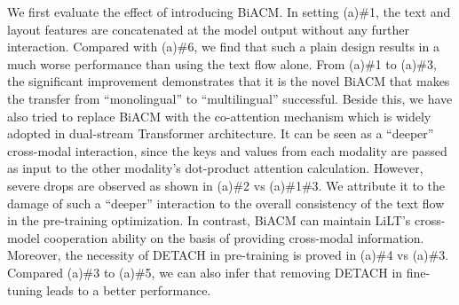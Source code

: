 \documentclass[11pt]{article}
\begin{document}
We first evaluate the effect of introducing BiACM. In setting (a)\#1, the text and layout features are concatenated at the model output without any further interaction.
Compared with (a)\#6, we find that such a plain design results in a much worse performance than using the text flow alone. 
From  (a)\#1 to  (a)\#3, the significant improvement demonstrates that 
it is the novel BiACM that makes the transfer from ``monolingual” to ``multilingual” successful. Beside this, we have also tried to replace BiACM with the co-attention mechanism \cite{lu2019vilbert} which is widely adopted in  dual-stream Transformer architecture. It can be seen as a  ``deeper” cross-modal interaction, since  the keys and values from each modality are passed as input to the other modality’s dot-product attention calculation. However, severe drops are observed as shown in (a)\#2 vs (a)\#1\#3. We attribute it to  the damage of such a ``deeper”  interaction to the overall consistency of the text flow in the pre-training optimization. In contrast, BiACM can maintain LiLT's cross-model cooperation ability on the basis of providing cross-modal information.
Moreover, the necessity of DETACH in pre-training is  proved  in (a)\#4 vs (a)\#3.
Compared (a)\#3 to (a)\#5, we can also infer that removing DETACH in fine-tuning leads to a better performance.


\begin{table}[!]
\centering
{}
\caption{Comparison on the semantic entity recognition (SER)  task of CORD \cite{park2019cord} dataset. \cite{garncarek2020lambert};\cite{2021going}.}
\label{tab:cord}
\end{table}
\end{document}
